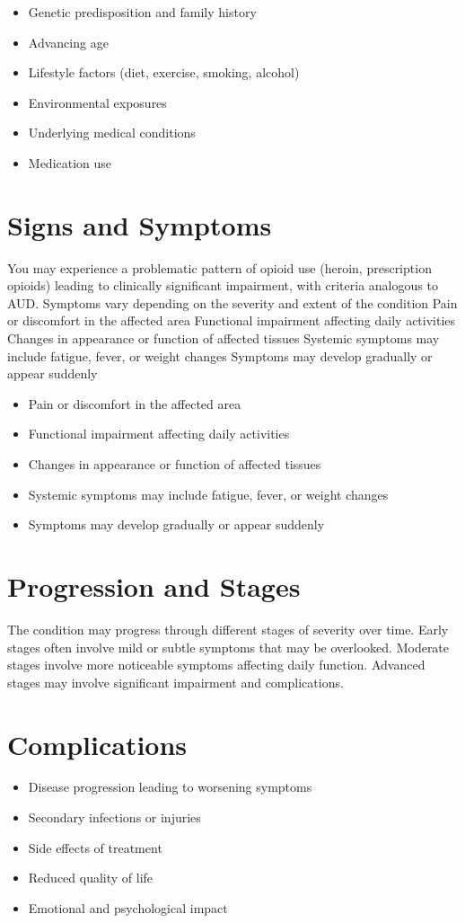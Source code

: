 \begin{itemize}[noitemsep]
  \item Genetic predisposition and family history
  \item Advancing age
  \item Lifestyle factors (diet, exercise, smoking, alcohol)
  \item Environmental exposures
  \item Underlying medical conditions
  \item Medication use
\end{itemize}
\section{Signs and Symptoms}
You may experience a problematic pattern of opioid use (heroin, prescription opioids) leading to clinically significant impairment, with criteria analogous to AUD. Symptoms vary depending on the severity and extent of the condition Pain or discomfort in the affected area Functional impairment affecting daily activities Changes in appearance or function of affected tissues Systemic symptoms may include fatigue, fever, or weight changes Symptoms may develop gradually or appear suddenly

\begin{itemize}[noitemsep]
  \item Pain or discomfort in the affected area
  \item Functional impairment affecting daily activities
  \item Changes in appearance or function of affected tissues
  \item Systemic symptoms may include fatigue, fever, or weight changes
  \item Symptoms may develop gradually or appear suddenly
\end{itemize}
\section{Progression and Stages}
The condition may progress through different stages of severity over time. Early stages often involve mild or subtle symptoms that may be overlooked. Moderate stages involve more noticeable symptoms affecting daily function. Advanced stages may involve significant impairment and complications.
\section{Complications}
\begin{itemize}[noitemsep]
  \item Disease progression leading to worsening symptoms
  \item Secondary infections or injuries
  \item Side effects of treatment
  \item Reduced quality of life
  \item Emotional and psychological impact
\end{itemize}
